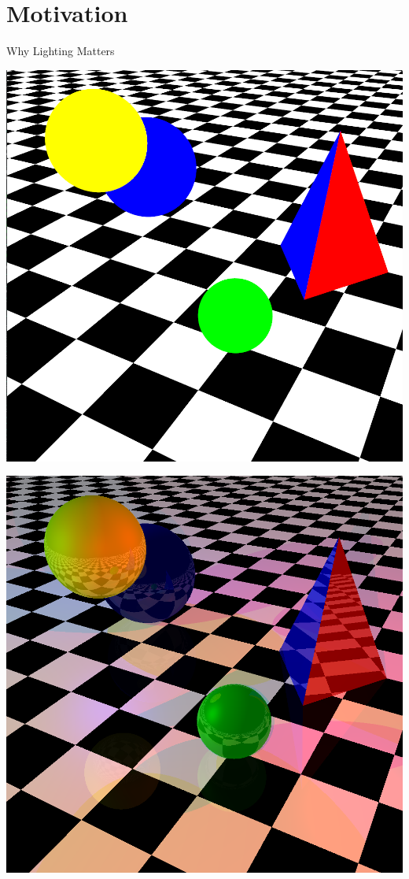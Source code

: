\section{Motivation}

\begin{frame}{Why Lighting Matters}
  \vspace{0.5cm}
  \pause
  \begin{minipage}{0.45\textwidth}
    \centering
    \includegraphics[width=\linewidth]{images/flat.png}
  \end{minipage}%
  \hfill
  \pause
  \begin{minipage}{0.45\textwidth}
    \centering
    \includegraphics[width=\linewidth]{images/rtx.png}
  \end{minipage}


\end{frame}
